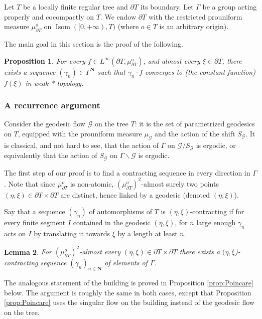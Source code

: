 \documentclass[a4paper, 11pt]{article}
\theoremstyle{plain}
\newtheorem{proposition}{Proposition}[section]
\newtheorem{lemma}[proposition]{Lemma}
\theoremstyle{definition}
\theoremstyle{remark}
\DeclareMathOperator{\Isom}{Isom}
\newcommand{\NN}{\mathbf{N}}                          %
\begin{document}
Let $T$ be a locally finite regular tree and $\partial T$ its boundary. Let $\Gamma$ be a group acting properly and cocompactly on $T$. We endow $\partial T$ with the restricted prouniform measure $\mu_{\partial T}^o$ on $\Isom([0,+\infty),T)$ (where $o\in T$ is an arbitrary origin).

The main goal in this section is the proof of the following.

\begin{proposition}\label{prop:tree}
    For every $f\in L^\infty(\partial T,\mu_{\partial T}^o)$, and almost every $\xi\in \partial T$, there exists a sequence $(\gamma_n)\in \Gamma^\NN$ such that $\gamma_n\cdot f$ converges to (the constant function) $f(\xi)$ in weak-* topology.
\end{proposition}

\subsubsection{A recurrence argument}

Consider the geodesic flow $\mathscr G$ on the tree $T$: it is the set of parametrized geodesics on $T$, equipped with the prouniform measure $\mu_{\mathscr G}$ and the action of the shift $S_{\mathscr G}$. It is classical, and not hard to see, that the action of $\Gamma$ on $\mathscr G/S_{\mathscr G}$ is ergodic, or equivalently that the action of $S_{\mathscr G}$ on $\Gamma\backslash \mathscr G$ is ergodic. 

The first step of our proof is to find a contracting sequence in every direction in $\Gamma$. Note that since $\mu_{\partial T}^o$ is non-atomic, $(\mu_{\partial T}^o)^2$-almost surely two points $(\eta,\xi)\in\partial T\times \partial T$ are distinct, hence linked by a geodesic (denoted $(\eta,\xi)$).

Say that a sequence $(\gamma_n)$ of automorphisms of $T$ is $(\eta,\xi)$-contracting if for every finite segment $I$ contained in the geodesic $(\eta,\xi)$, for $n$ large enough $\gamma_n$ acts on $I$ by translating it towards $\xi$ by a length at least $n$.

\begin{lemma}\label{lem:treesec}
    For $(\mu_{\partial T}^o)^2$-almost every $(\eta,\xi)\in\partial T\times \partial T$ there exists 
    a $(\eta,\xi$)-contracting sequence $(\gamma_n)_{n\in\NN}$ of elements of $\Gamma$.
\end{lemma}

The analogous statement of the building is proved in Proposition \ref{prop:Poincare} below. The argument is roughly the same in both cases, except that Proposition \ref{prop:Poincare} uses the singular flow on the building instead of the geodesic flow on the tree.
\end{document}
